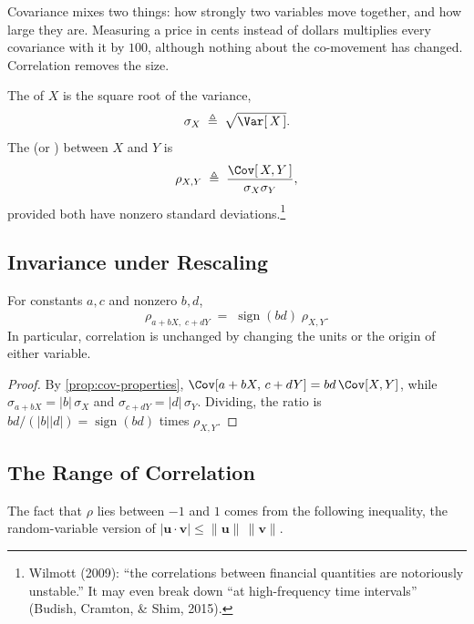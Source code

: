 
\suppstart
Covariance mixes two things: how strongly two variables move together, and how large they are.
Measuring a price in cents instead of dollars multiplies every covariance with it by $100$, although nothing about the co-movement has changed.
Correlation removes the size.
\suppend

\begin{definition}
	The  of $X$ is the square root of the variance,
	\[
		\sigma_{X} \;\triangleq\; \sqrt{\Var[\,X\,]} .
	\]
	The  (or ) between $X$ and $Y$ is
	\begin{equation}
		\rho_{X,Y} \;\triangleq\; \frac{\Cov[\,X,Y\,]}{\sigma_{X}\sigma_{Y}} , \label{eq:correlation}
	\end{equation}
	provided both have nonzero standard deviations.\footnote{Wilmott (2009): ``the correlations between financial quantities are notoriously unstable.'' It may even break down ``at high-frequency time intervals'' (Budish, Cramton, \& Shim, 2015).}
\end{definition}

\subsection{Invariance under Rescaling}

\suppstart
\begin{proposition}\label{prop:corr-invariance}
	For constants $a,c$ and nonzero $b,d$,
	\[
		\rho_{a+bX,\;c+dY} \;=\; \operatorname{sign}(bd)\;\rho_{X,Y} .
	\]
	In particular, correlation is unchanged by changing the units or the origin of either variable.
\end{proposition}

\begin{proof}
	By \autoref{prop:cov-properties}, $\Cov[a+bX,\,c+dY]=bd\,\Cov[X,Y]$, while $\sigma_{a+bX}=|b|\,\sigma_{X}$ and $\sigma_{c+dY}=|d|\,\sigma_{Y}$.
	Dividing, the ratio is $bd/(|b||d|)=\operatorname{sign}(bd)$ times $\rho_{X,Y}$.
\end{proof}

\subsection{The Range of Correlation}

The fact that $\rho$ lies between $-1$ and $1$ comes from the following inequality, the random-variable version of $|\bm{u}\cdot\bm{v}|\le\|\bm{u}\|\,\|\bm{v}\|$.


